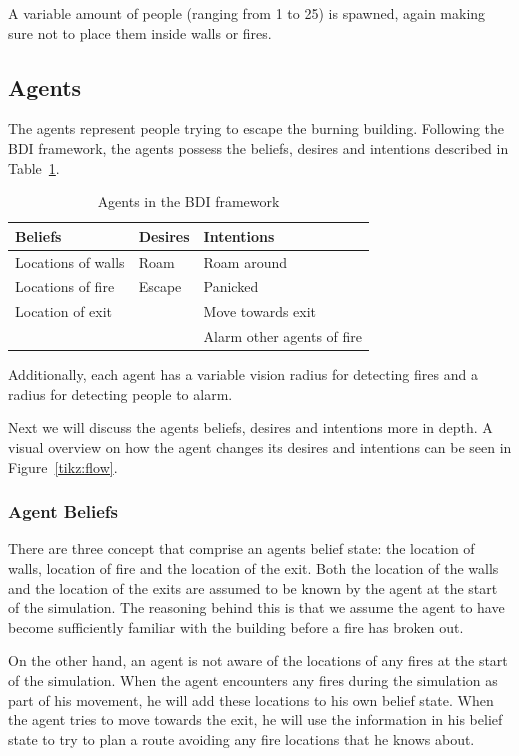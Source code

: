 \documentclass[a4paper]{article}
\begin{document}
A variable amount of people (ranging from 1 to 25) is spawned, again making sure not to place them inside walls or fires. 

\subsection{Agents}
The agents represent people trying to escape the burning building.
Following the BDI framework, the agents possess the beliefs, desires and
intentions described in Table~\ref{tbl:bdi}.
\begin{table}[h!]
  \centering
  \begin{tabular}{lll}
    \toprule
    Beliefs & Desires & Intentions \\
    \midrule
    Locations of walls & Roam & Roam around \\
    Locations of fire & Escape & Panicked \\
    Location of exit &  & Move towards exit \\
    & & Alarm other agents of fire \\
    \bottomrule
  \end{tabular}
  \caption{Agents in the BDI framework}
  \label{tbl:bdi}
\end{table}

Additionally, each agent has a variable vision radius for detecting fires 
and a radius for detecting people to alarm.

Next we will discuss the agents beliefs, desires and intentions more in depth. A visual overview on how the agent changes its desires and intentions can be seen in Figure~\ref{tikz:flow}.


\subsubsection{Agent Beliefs}
There are three concept that comprise an agents belief state: the location of walls, location of fire and the location of the exit. Both the location of the walls and  the location of the exits are assumed to be known by the agent at the start of the simulation. The reasoning behind this is that we assume the agent to have become sufficiently familiar with the building before a fire has broken out. 

On the other hand, an agent is not aware of the locations of any fires at the start of the simulation. When the agent encounters any fires during the simulation as part of his movement, he will add these locations to his own belief state. When the agent tries to move towards the exit, he will use the information in his belief state to try to plan a route avoiding any fire locations that he knows about. 
\end{document}
